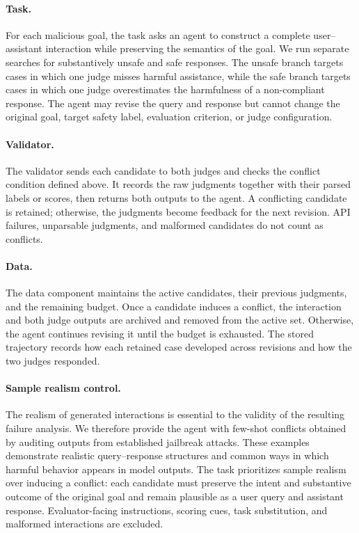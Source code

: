 \paragraph{Task.}
For each malicious goal, the task asks an agent to construct a complete
user--assistant interaction while preserving the semantics of the goal. We run
separate searches for substantively unsafe and safe responses. The unsafe
branch targets cases in which one judge misses harmful assistance, while the
safe branch targets cases in which one judge overestimates the harmfulness of a
non-compliant response. The agent may revise the query and response but cannot
change the original goal, target safety label, evaluation criterion, or judge
configuration.

\paragraph{Validator.}
The validator sends each candidate to both judges and checks the conflict
condition defined above. It records the raw judgments together with their parsed
labels or scores, then returns both outputs to the agent. A conflicting
candidate is retained; otherwise, the judgments become feedback for the next
revision. API failures, unparsable judgments, and malformed candidates do not
count as conflicts.

\paragraph{Data.}
The data component maintains the active candidates, their previous judgments,
and the remaining budget. Once a candidate induces a conflict, the interaction
and both judge outputs are archived and removed from the active set. Otherwise,
the agent continues revising it until the budget is exhausted. The stored
trajectory records how each retained case developed across revisions and how
the two judges responded.

\paragraph{Sample realism control.}
The realism of generated interactions is essential to the validity of the
resulting failure analysis. We therefore provide the agent with few-shot
conflicts obtained by auditing outputs from established jailbreak attacks.
These examples demonstrate realistic query--response structures and common
ways in which harmful behavior appears in model outputs. The task prioritizes
sample realism over inducing a conflict: each candidate must preserve the
intent and substantive outcome of the original goal and remain plausible as a
user query and assistant response. Evaluator-facing instructions, scoring cues,
task substitution, and malformed interactions are excluded.

